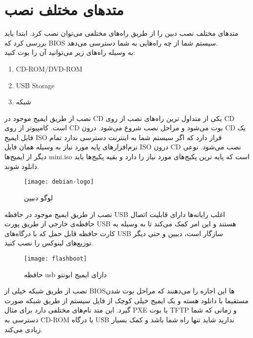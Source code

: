 \section{متدهای مختلف نصب}
\begin{frame}{متدهای مختلف نصب}
  دبین را از طریق راه‌های مختلفی می‌توان نصب کرد. ابتدا باید بررسی کرد که BIOS سیستم شما از چه راه‌هایی به شما دسترسی می‌دهد.\\
 به وسیله راه‌های زیر می‌توانید آن را بوت کنید:
\begin{enumerate}
  \item CD-ROM/DVD-ROM
  \item USB Storage
  \item شبکه
\end{enumerate}
\end{frame}
\begin{frame}{نصب از طریق ایمیج موجود در CD}
  یکی از متداول ترین راه‌های نصب از روی CD است.
کامپیوتر از روی CD بوت می‌شود و مراحل نصب شروع می‌شود. درون CD یک فایل ایمیج ISO قرار دارد که اگر سیستم شما به اینترنت دسترسی ندارد تمام نرم‌افزارهای پایه مورد نیاز به وسیله همان فایل ISO درون CD نصب می‌شود.
نوعی دیگر از ایمیج‌ها mini.iso  است که پایه ترین پکیج‌های مورد نیاز را دارد و بقیه پکیج‌ها باید دانلود شوند.
\begin{figure}
    \centering
    \texttt{[image: debian-logo]}
    \caption{لوگو دبیین~\cite{fig:wp:deb_live}}
\end{figure}
\end{frame}
\begin{frame}{نصب از طریق ایمیج موجود در حافظه USB}
  اغلب رایانه‌ها دارای قابلیت اتصال حافظه‌ی خارجی از طریق پورت USB هستند و این امر کمک می‌کند تا به وسیله یه کارت حافظه قابل حمل که با درگاه‌های USB سازگار است، دبیین و حتی دیگر توزیع‌های لینوکس را نصب کنید.
\begin{figure}
  \centering
  \texttt{[image: flashboot]}
  \caption{حافظه usb دارای ایمیج ابونتو~\cite{fig:usb_bootable}}
\end{figure}
\end{frame}
\begin{frame}{نصب از طریق شبکه}
  خیلی از BIOS‌ها این اجازه را می‌دهنند که مراحل بوت شدن مستقیما با دانلود هسته و یک ایمیج خیلی کوچک از فایل سیستم‌ از طریق شبکه صورت گیرد.
  این متد نام‌های مختلفی دارد برای مثال PXE یا بوت TFTP و زمانی که شما دسترسی به CD-ROM یا درگاه USB ندارید شاید تنها راه شما باشد و کمک بسیار زیادی می‌کند.\\
\end{frame}

